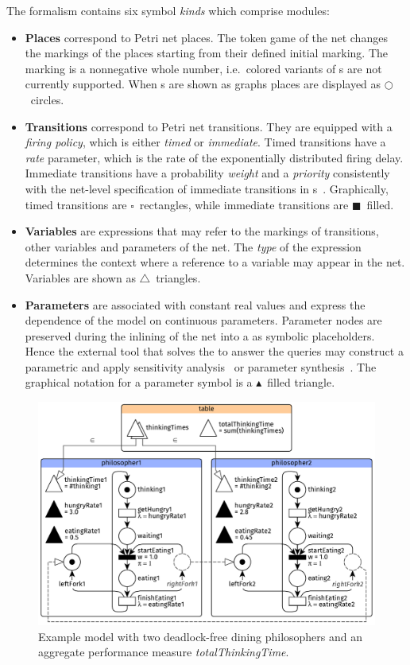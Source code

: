 The  formalism contains six symbol \emph{kinds} which comprise  modules:
\begin{itemize}
\item \textbf{Places} correspond to Petri net places. The token game of the net changes the markings of the places starting from their defined initial marking. The marking is a nonnegative whole number, i.e.~colored variants of s are not currently supported. When s are shown as graphs places are displayed as \(\bigcirc\)~circles.
\item \textbf{Transitions} correspond to Petri net transitions. They are equipped with a \emph{firing policy}, which is either \emph{timed} or \emph{immediate}. Timed transitions have a \emph{rate} parameter, which is the rate of the exponentially distributed firing delay. Immediate transitions have a probability \emph{weight} and a \emph{priority} consistently with the net-level specification of immediate transitions in s~\citep{}. Graphically, timed transitions are \(\square\)~rectangles, while immediate transitions are \(\blacksquare\)~filled.
\item \textbf{Variables} are expressions that may refer to the markings of transitions, other variables and parameters of the net. The \emph{type} of the expression determines the context where a reference to a variable may appear in the net. Variables are shown as \(\triangle\)~triangles.
\item \textbf{Parameters} are associated with constant real values and express the dependence of the model on continuous parameters. Parameter nodes are preserved during the inlining of the net into a  as symbolic placeholders. Hence the external tool that solves the  to answer the queries may construct a parametric  and apply sensitivity analysis~ or parameter synthesis~. The graphical notation for a parameter symbol is a \(\blacktriangle\)~filled triangle.
\end{itemize}

\begin{figure}
  \centering
  \includegraphics{figures/rgspn_example}
  \caption{Example  model with two deadlock-free dining philosophers and an aggregate performance measure \textit{totalThinkingTime}.}
\end{figure}

